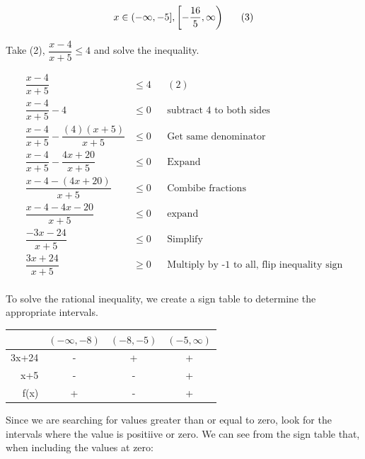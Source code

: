 \documentclass[12pt]{book}
\begin{document}
\begin{enumerate}
$$x \in (-\infty, -5], \left[ -\frac{16}{5}, \infty \right) \text{\space\space\space\space\space} (3)$$

\vspace{1cm}

Take (2), $\dfrac{x-4}{x+5} \le 4$ and solve the inequality.

\begin{align*}
    \dfrac{x-4}{x+5} &\le 4 && (2)\\
    \dfrac{x-4}{x+5} - 4 &\le 0 && \text{subtract 4 to both sides} \\
    \dfrac{x-4}{x+5} - \dfrac{(4)(x+5)}{x+5} &\le 0 && \text{Get same denominator} \\
    \dfrac{x-4}{x+5} - \dfrac{4x+20}{x+5} &\le 0 && \text{Expand} \\
    \dfrac{x-4-(4x+20)}{x+5} &\le 0 && \text{Combibe fractions} \\
    \dfrac{x-4-4x-20}{x+5} &\le 0 && \text{expand} \\
    \dfrac{-3x-24}{x+5} &\le 0 && \text{Simplify} \\
    \dfrac{3x+24}{x+5} &\geq 0 && \text{Multiply by -1 to all, flip inequality sign} \\
\end{align*}

\newpage

\begin{center}
To solve the rational inequality, we create a sign table
 to determine the appropriate intervals.
\end{center}
\vspace{0.5cm}

\begin{center}
    \begin{tabular}{|r|c|c|c|}
        \hline
        & $(-\infty, -8)$ & $(-8, -5)$ & $(-5, \infty)$ \\ \hline
        3x+24 & - & + & + \\ \hline
        x+5 & - & - & + \\ \hline
        f(x) & + & - & + \\ \hline
    \end{tabular}
\end{center}

\vspace{0.3cm}

Since we are searching for values greater than or equal to zero,
 look for the intervals where the value is positiive or zero. We can see
  from the sign table that, when including the values at zero:


\end{enumerate}
\end{document}

